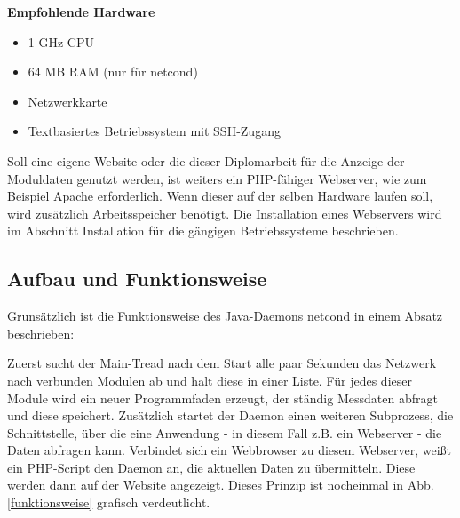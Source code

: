 \documentclass[a4paper,14pt,headsepline]{scrartcl}
\begin{document}
\textbf{Empfohlende Hardware}

\begin{itemize}
	\item 1 GHz CPU
	\item 64 MB RAM (nur für netcond)
	\item Netzwerkkarte
	\item Textbasiertes Betriebssystem mit SSH-Zugang
\end{itemize}

Soll eine eigene Website oder die dieser Diplomarbeit für die Anzeige der Moduldaten genutzt werden, ist weiters ein PHP-fähiger Webserver, wie zum Beispiel Apache erforderlich. Wenn dieser auf der selben Hardware laufen soll, wird zusätzlich Arbeitsspeicher benötigt. Die Installation eines Webservers wird im Abschnitt Installation für die gängigen Betriebssysteme beschrieben. 

\newpage

\subsection{Aufbau und Funktionsweise}

Grunsätzlich ist die Funktionsweise des Java-Daemons netcond in einem Absatz beschrieben:

 Zuerst sucht der Main-Tread nach dem Start alle paar Sekunden das Netzwerk nach verbunden Modulen ab und halt diese in einer Liste. Für jedes dieser Module wird ein neuer Programmfaden erzeugt, der ständig Messdaten abfragt und diese speichert. Zusätzlich startet der Daemon einen weiteren Subprozess, die Schnittstelle, über die eine Anwendung - in diesem Fall z.B. ein Webserver - die Daten abfragen kann. Verbindet sich ein Webbrowser zu diesem Webserver, weißt ein PHP-Script den Daemon an, die aktuellen Daten zu übermitteln. Diese werden dann auf der Website angezeigt. Dieses Prinzip ist nocheinmal in Abb. \ref{funktionsweise} grafisch verdeutlicht.
\end{document}
